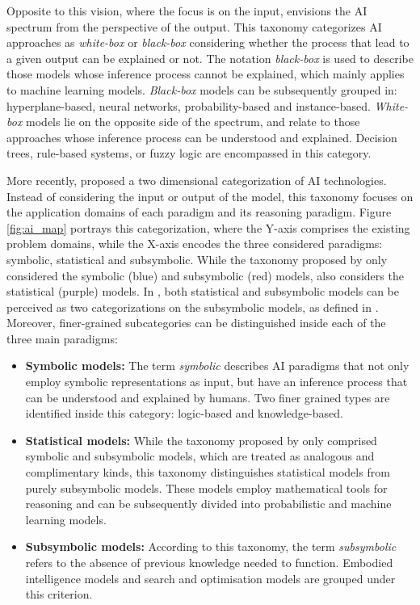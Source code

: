 Opposite to this vision, where the focus is on the input, \cite{loyola-gonzalez_black-box_2019} envisions the AI spectrum from the perspective of the output. This taxonomy categorizes AI approaches as \textit{white-box} or \textit{black-box} considering whether the process that lead to a given output can be explained or not. The notation \textit{black-box} is used to describe those models whose inference process cannot be explained, which mainly applies to machine learning models. \textit{Black-box} models can be subsequently grouped in: hyperplane-based, neural networks, probability-based and instance-based. \textit{White-box} models lie on the opposite side of the spectrum, and relate to those approaches whose inference process can be understood and explained. Decision trees, rule-based systems, or fuzzy logic are encompassed in this category.


More recently, \cite{corea_ai_2019} proposed a two dimensional categorization of AI technologies. Instead of considering the input or output of the model, this taxonomy focuses on the application domains of each paradigm and its reasoning paradigm. Figure \ref{fig:ai_map} portrays this categorization, where the Y-axis comprises the existing problem domains, while the X-axis encodes the three considered paradigms: symbolic, statistical and subsymbolic. While the taxonomy proposed by \cite{lieberman_symbolic_nodate} only considered the symbolic (blue) and subsymbolic (red) models, \cite{corea_ai_2019} also considers the statistical (purple) models. In \cite{corea_ai_2019}, both statistical and subsymbolic models can be perceived as two categorizations on the subsymbolic models, as defined in \cite{lieberman_symbolic_nodate}. Moreover, finer-grained subcategories can be distinguished inside each of the three main paradigms:

\begin{itemize}
    \item \textbf{Symbolic models:} The term \textit{symbolic} describes AI paradigms that not only employ symbolic representations as input, but have an inference process that can be understood and explained by humans. Two finer grained types are identified inside this category: logic-based and knowledge-based.
    \item \textbf{Statistical models:} While the taxonomy proposed by \cite{lieberman_symbolic_nodate} only comprised symbolic and subsymbolic models, which are treated as analogous and complimentary kinds, this taxonomy distinguishes statistical models from purely subsymbolic models. These models employ mathematical tools for reasoning and can be subsequently divided into probabilistic and machine learning models.
    \item\textbf{Subsymbolic models:} According to this taxonomy, the term \textit{subsymbolic} refers to the absence of previous knowledge needed to function. Embodied intelligence models and search and optimisation models are grouped under this criterion.
\end{itemize}

